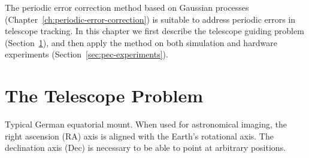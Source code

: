 The periodic error correction method based on Gaussian processes
(Chapter~\ref{ch:periodic-error-correction}) is suitable to address periodic
errors in telescope tracking. In this chapter we first describe the telescope
guiding problem (Section~\ref{sec:problem-statement}), and then apply the method
on both simulation and hardware experiments (Section~\ref{sec:pec-experiments}).

\section{The Telescope Problem}
\label{sec:problem-statement}

\begin{marginfigure}
\centering%
\footnotesize%
  \caption[Typical German equatorial mount.]{Typical German equatorial
mount. When used for astronomical imaging, the right ascension (RA) axis is
aligned with the Earth's rotational axis. The declination axis (Dec) is
necessary to be able to point at arbitrary
positions.}
  \label{fig:equatorial-mount}
\end{marginfigure}

